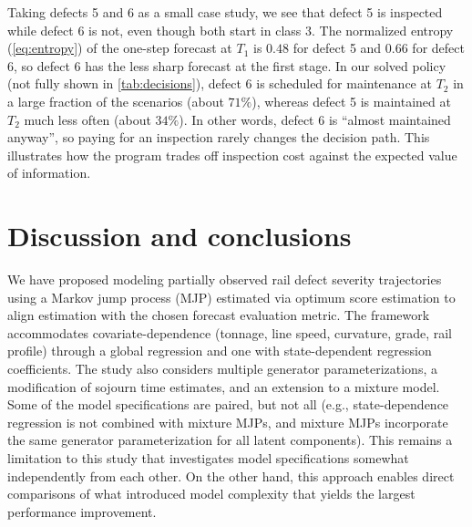 \documentclass{article}
\begin{document}
Taking defects 5 and 6 as a small case study, we see that defect 5 is inspected while defect 6 is not, even though both start in class $3$. The normalized entropy (\cref{eq:entropy}) of the one-step forecast at $T_1$ is $0.48$ for defect 5 and $0.66$ for defect 6, so defect 6 has the less sharp forecast at the first stage. %
In our solved policy (not fully shown in \cref{tab:decisions}), defect 6 is scheduled for maintenance at $T_2$ in a large fraction of the scenarios (about $71\%$), whereas defect 5 is maintained at $T_2$ much less often (about $34\%$). In other words, defect 6 is ``almost maintained anyway'', so paying for an inspection rarely changes the decision path. This illustrates how the program trades off inspection cost against the expected value of information.





\section{Discussion and conclusions} \label{sec:conclusion}
We have proposed modeling partially observed rail defect severity trajectories using a Markov jump process (MJP) estimated via optimum score estimation to align estimation with the chosen forecast evaluation metric. The framework accommodates covariate-dependence (tonnage, line speed, curvature, grade, rail profile) through a global regression and one with state-dependent regression coefficients. The study also considers multiple generator parameterizations, a modification of sojourn time estimates, and an extension to a mixture model.
Some of the model specifications are paired, but not all (e.g., state-dependence regression is not combined with mixture MJPs, and mixture MJPs incorporate the same generator parameterization for all latent components). This remains a limitation to this study that investigates model specifications somewhat independently from each other. On the other hand, this approach enables direct comparisons of what introduced model complexity that yields the largest performance improvement.
\end{document}
